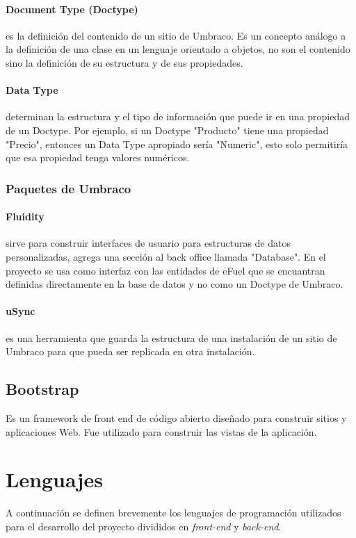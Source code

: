     \paragraph{Document Type (Doctype)} es la definición del contenido de un sitio de Umbraco. Es un concepto análogo a la definición de una clase en un lenguaje orientado a objetos, no son el contenido sino la definición de su estructura y de sus propiedades.
    \paragraph{Data Type} determinan la estructura y el tipo de información que puede ir en una propiedad de un Doctype. Por ejemplo, si un Doctype "Producto" tiene una propiedad "Precio", entonces un Data Type apropiado sería "Numeric", esto solo permitiría que esa propiedad tenga valores numéricos.

    \subsubsection{Paquetes de Umbraco}
    \paragraph{Fluidity} sirve para construir interfaces de usuario para estructuras de datos personalizadas, agrega una sección al back office llamada "Database". En el proyecto se usa como interfaz con las entidades de eFuel que se encuantran definidas directamente en la base de datos y no como un Doctype de Umbraco.
    \paragraph{uSync} es una herramienta que guarda la estructura de una instalación de un sitio de Umbraco para que pueda ser replicada en otra instalación.

    \subsection{Bootstrap}
    Es un framework de front end de código abierto diseñado para construir sitios y aplicaciones Web. Fue utilizado para construir las vistas de la aplicación.

\section{Lenguajes}
A continuación se definen brevemente los lenguajes de programación utilizados para el desarrollo del proyecto divididos en \textit{front-end} y \textit{back-end}.

